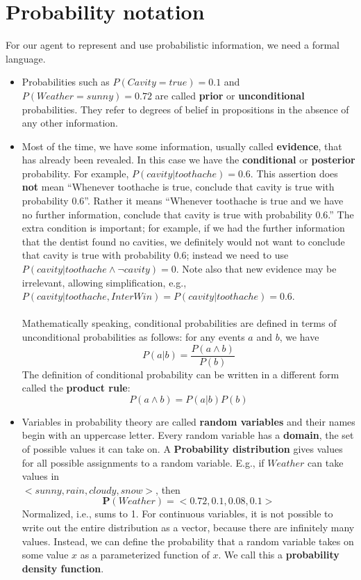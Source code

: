\section{Probability notation}
For our agent to represent and use probabilistic information, we need a formal language.
\begin{itemize}
    \item Probabilities such as $P(Cavity = true)=0.1$ and $P(Weather = sunny)=0.72$ are called \textbf{prior} or \textbf{unconditional} probabilities. They refer to degrees of belief in propositions in the absence of any other information.

    \item Most of the time, we have some information, usually called \textbf{evidence}, that has already been revealed. In this case we have the \textbf{conditional} or \textbf{posterior} probability. For example, $P(cavity|toothache)=0.6$. This assertion does \textbf{not} mean “Whenever toothache is true, conclude that cavity is true with probability 0.6”. Rather it means “Whenever toothache is true and we have no further information, conclude that cavity is true with probability 0.6.”  The extra condition is important; for example, if we had the further information that the dentist found no cavities, we definitely would not want to conclude that cavity is true with probability 0.6; instead we need to use $P(cavity|toothache \land \neg cavity)=0.$ Note also that new evidence may be irrelevant, allowing simplification, e.g., $P(cavity|toothache, InterWin) = P(cavity|toothache)=0.6$.\\\\
    Mathematically speaking, conditional probabilities are defined in terms of unconditional probabilities as follows: for any events $a$ and $b$, we have
    \[P(a | b) = \frac{P(a \land b)}{P(b)}\]
    The definition of conditional probability  can be written in a different form called the \textbf{product rule}:
    \[P(a \land b) = P(a|b)P(b)\]
    
    
    
    \item Variables in probability theory are called \textbf{random variables} and their names begin with an uppercase letter. Every random variable has a \textbf{domain}, the set of possible values it can take on. A \textbf{Probability distribution} gives values for all possible assignments to a random variable. E.g., if $Weather$ can take values in \\$<sunny,rain,cloudy,snow>$, then
    \[\textbf{P}(Weather) = <0.72, 0.1, 0.08, 0.1>\]
     Normalized, i.e., sums to 1. For continuous variables, it is not possible to write out the entire distribution as a vector, because there are infinitely many values. Instead, we can define the probability that a random variable takes on some value $x$ as a parameterized function of $x$. We call this a \textbf{probability density function}.


\end{itemize}
